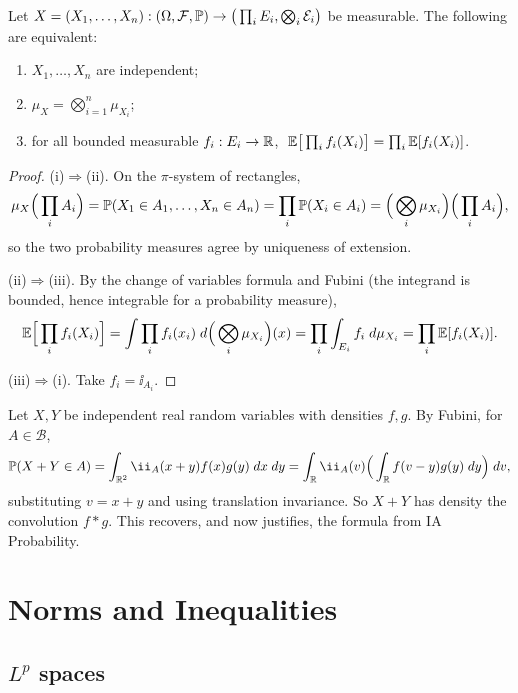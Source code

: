 \documentclass[a4paper]{scrartcl}
\newcommand{\cB}{\mathcal{B}}
\newcommand{\cE}{\mathcal{E}}
\newcommand{\cF}{\mathcal{F}}
\newcommand{\ind}{\ii}
\begin{document}
\begin{proposition}\label{prop:indep-product}
	Let $X = (X_1,\dots,X_n) : (\Omega,\cF,\PP)\to \big(\prod_i E_i, \bigotimes_i \cE_i\big)$ be measurable. The following are equivalent:
	\begin{enumerate}[label=(\roman*)]
		\item $X_1,\dots,X_n$ are independent;
		\item $\mu_X = \bigotimes_{i=1}^n \mu_{X_i}$;
		\item for all bounded measurable $f_i : E_i \to \mathbb{R}$, $\;\mathbb{E}\big[\prod_i f_i(X_i)\big] = \prod_i \mathbb{E}[f_i(X_i)]$.
	\end{enumerate}
\end{proposition}
\begin{proof}
	(i)$\Rightarrow$(ii). On the $\pi$-system of rectangles,
	$$
	\mu_X\Big(\prod_i A_i\Big) = \mathbb{P}(X_1\in A_1,\dots,X_n\in A_n)=\prod_i \mathbb{P}(X_i\in A_i) = \Big(\bigotimes_i\mu_{X_i}\Big)\Big(\prod_i A_i\Big),
	$$
	so the two probability measures agree by uniqueness of extension.

	(ii)$\Rightarrow$(iii). By the change of variables formula and Fubini (the integrand is bounded, hence integrable for a probability measure),
	$$
	\mathbb{E}\Big[\prod_i f_i(X_i)\Big] = \int \prod_i f_i(x_i)\; d\Big(\bigotimes_i\mu_{X_i}\Big)(x) = \prod_i \int_{E_i} f_i\; d\mu_{X_i} = \prod_i \mathbb{E}[f_i(X_i)].
	$$

	(iii)$\Rightarrow$(i). Take $f_i = \ind_{A_i}$.
\end{proof}

\begin{example}
	Let $X,Y$ be independent real random variables with densities $f,g$. By Fubini, for $A \in \cB$,
	$$
	\PP(X+Y\in A) = \int_{\R^2}\ind_A(x+y)f(x)g(y)\dd x\dd y = \int_\R \ind_A(v)\Big(\int_\R f(v-y)g(y)\dd y\Big)\dd v,
	$$
	substituting $v = x+y$ and using translation invariance. So $X+Y$ has density the convolution $f * g$. This recovers, and now justifies, the formula from IA Probability.
\end{example}
\section{Norms and Inequalities}

\subsection{\texorpdfstring{$L^p$}{Lp} spaces}
\end{document}
